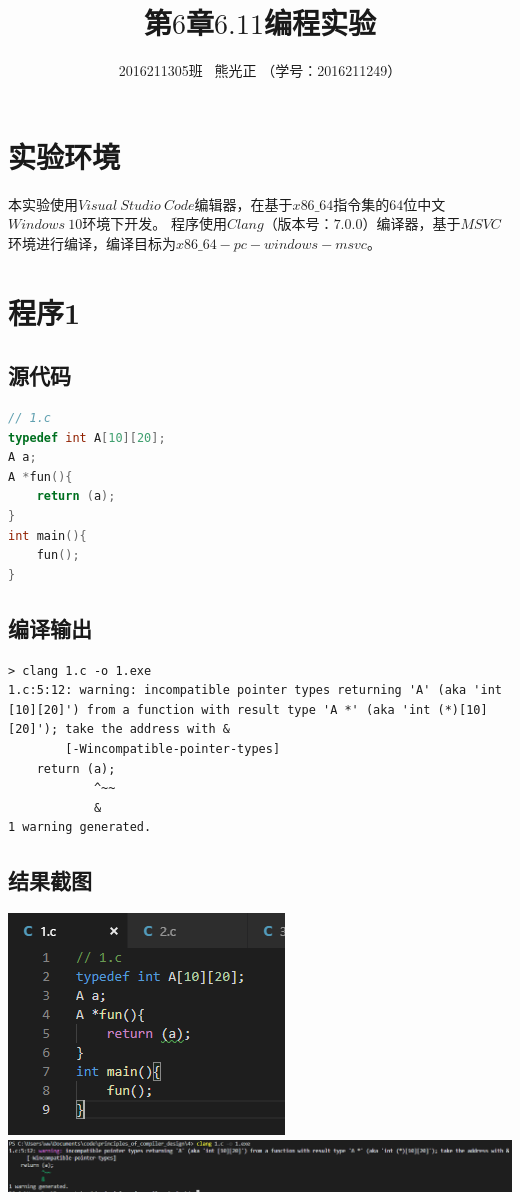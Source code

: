 \documentclass[UTF8]{ctexart}
\title{第$6$章$6.11$编程实验 }
\author{2016211305班 \ 熊光正 （学号：2016211249）}
\begin{document}
\lstset{numbers=left,frame=single,breaklines=true}
\maketitle
\section{实验环境}
本实验使用$Visual \ Studio \ Code$编辑器，在基于$x86\_64$指令集的$64$位中文$Windows \ 10$环境下开发。
程序使用$Clang$（版本号：$7.0.0$）编译器，基于$MSVC$环境进行编译，编译目标为$x86\_64-pc-windows-msvc$。
\section{程序1}
\subsection{源代码}
\begin{lstlisting}[language={C}]
// 1.c
typedef int A[10][20];
A a;
A *fun(){
    return (a);
}
int main(){
    fun();
}
    \end{lstlisting}
\subsection{编译输出}
\begin{lstlisting}
> clang 1.c -o 1.exe
1.c:5:12: warning: incompatible pointer types returning 'A' (aka 'int [10][20]') from a function with result type 'A *' (aka 'int (*)[10][20]'); take the address with &
        [-Wincompatible-pointer-types]
    return (a);
            ^~~
            &
1 warning generated.
    \end{lstlisting}
\subsection{结果截图}
\includegraphics{1-code} \\
\includegraphics[width=\textwidth]{1-output}
\end{document}
